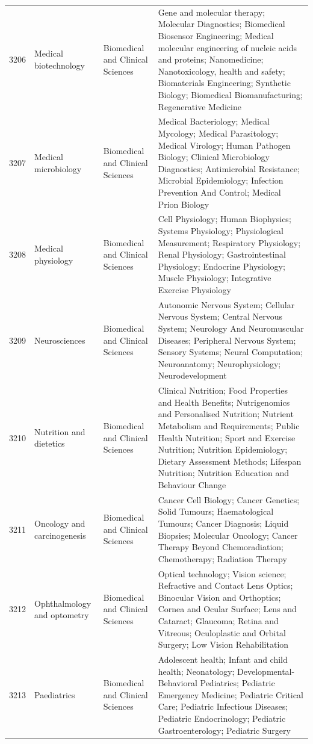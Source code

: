 \begin{longtable}{r p{2.45cm} p{2.55cm} p{6.15cm}}
3206 & Medical biotechnology & Biomedical and Clinical Sciences & Gene and molecular therapy; Molecular Diagnostics; Biomedical Biosensor Engineering; Medical molecular engineering of nucleic acids and proteins; Nanomedicine; Nanotoxicology, health and safety; Biomaterials Engineering; Synthetic Biology; Biomedical Biomanufacturing; Regenerative Medicine \\
3207 & Medical microbiology & Biomedical and Clinical Sciences & Medical Bacteriology; Medical Mycology; Medical Parasitology; Medical Virology; Human Pathogen Biology; Clinical Microbiology Diagnostics; Antimicrobial Resistance; Microbial Epidemiology; Infection Prevention And Control; Medical Prion Biology \\
3208 & Medical physiology & Biomedical and Clinical Sciences & Cell Physiology; Human Biophysics; Systems Physiology; Physiological Measurement; Respiratory Physiology; Renal Physiology; Gastrointestinal Physiology; Endocrine Physiology; Muscle Physiology; Integrative Exercise Physiology \\
3209 & Neurosciences & Biomedical and Clinical Sciences & Autonomic Nervous System; Cellular Nervous System; Central Nervous System; Neurology And Neuromuscular Diseases; Peripheral Nervous System; Sensory Systems; Neural Computation; Neuroanatomy; Neurophysiology; Neurodevelopment \\
3210 & Nutrition and dietetics & Biomedical and Clinical Sciences & Clinical Nutrition; Food Properties and Health Benefits; Nutrigenomics and Personalised Nutrition; Nutrient Metabolism and Requirements; Public Health Nutrition; Sport and Exercise Nutrition; Nutrition Epidemiology; Dietary Assessment Methods; Lifespan Nutrition; Nutrition Education and Behaviour Change \\
3211 & Oncology and carcinogenesis & Biomedical and Clinical Sciences & Cancer Cell Biology; Cancer Genetics; Solid Tumours; Haematological Tumours; Cancer Diagnosis; Liquid Biopsies; Molecular Oncology; Cancer Therapy Beyond Chemoradiation; Chemotherapy; Radiation Therapy \\
3212 & Ophthalmology and optometry & Biomedical and Clinical Sciences & Optical technology; Vision science; Refractive and Contact Lens Optics; Binocular Vision and Orthoptics; Cornea and Ocular Surface; Lens and Cataract; Glaucoma; Retina and Vitreous; Oculoplastic and Orbital Surgery; Low Vision Rehabilitation \\
3213 & Paediatrics & Biomedical and Clinical Sciences & Adolescent health; Infant and child health; Neonatology; Developmental-Behavioral Pediatrics; Pediatric Emergency Medicine; Pediatric Critical Care; Pediatric Infectious Diseases; Pediatric Endocrinology; Pediatric Gastroenterology; Pediatric Surgery \\

\end{longtable}
